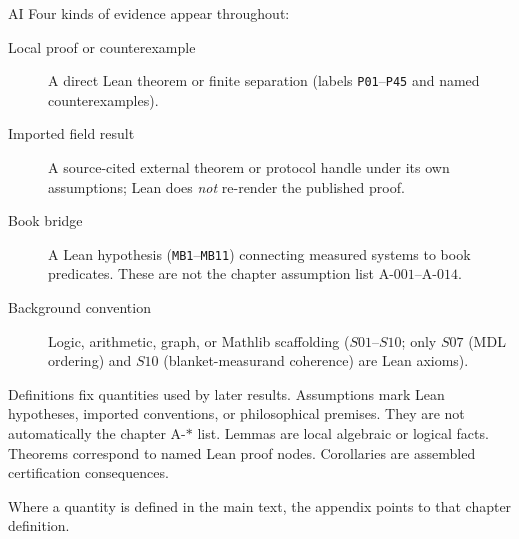 \begin{authbar}{AI}
Four kinds of evidence appear throughout:
\begin{description}
\item[Local proof or counterexample] A direct Lean theorem or finite separation (labels \texttt{P01}--\texttt{P45} and named counterexamples).
\item[Imported field result] A source-cited external theorem or protocol handle under its own assumptions; Lean does \emph{not} re-render the published proof.
\item[Book bridge] A Lean hypothesis (\texttt{MB1}--\texttt{MB11}) connecting measured systems to book predicates. These are not the chapter assumption list \(\text{A-001}\)--\(\text{A-014}\).
\item[Background convention] Logic, arithmetic, graph, or Mathlib scaffolding (\(S01\)--\(S10\); only \(S07\) (MDL ordering) and \(S10\) (blanket-measurand coherence) are Lean axioms).
\end{description}

Definitions fix quantities used by later results.
Assumptions mark Lean hypotheses, imported conventions, or philosophical premises. They are not automatically the chapter \(\text{A-*}\) list.
Lemmas are local algebraic or logical facts.
Theorems correspond to named Lean proof nodes.
Corollaries are assembled certification consequences.

Where a quantity is defined in the main text, the appendix points to that chapter definition.


\end{authbar}
\authbarneedspace
